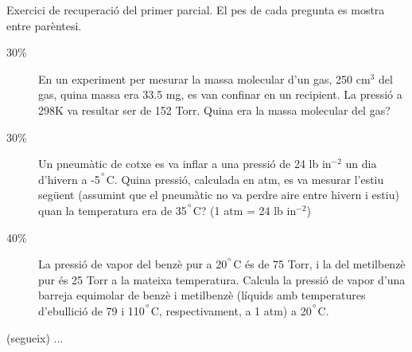 \documentclass[11pt]{article}
\begin{document}
\studentinfo
{}
\finishfirstpage

{
Exercici de recuperació del primer parcial. El pes de cada pregunta es mostra entre parèntesi.
\begin{description}
\item[30\%] En un experiment per mesurar la massa molecular d'un gas, 250 cm$^3$ del gas, quina massa era 33.5 mg, es van confinar en un recipient. La pressió a 298K va resultar ser de 152 Torr. Quina era la massa molecular del gas?
\item[30\%] Un pneumàtic de cotxe es va inflar a una pressió de 24 lb in$^{-2}$ un dia d'hivern a -5$^{\degree}$C. Quina pressió, calculada en atm, es va mesurar l'estiu següent (assumint que el pneumàtic no  va perdre aire entre hivern i estiu) quan la temperatura era de 35$^{\degree}$C? (1 atm = 24 lb in$^{-2}$)
\item[40\%] La pressió de vapor del benzè pur a 20$^{\degree}$C és de 75 Torr, i la del metilbenzè pur és 25 Torr a la mateixa temperatura. Calcula la pressió de vapor d'una barreja equimolar de benzè i metilbenzè (líquids amb temperatures d'ebullició de 79 i 110$^{\degree}$C, respectivament, a 1 atm) a 20$^{\degree}$C.
\end{description}
}
{
\vfill
\newpage (segueix) \newpage
}
{
...
}
\end{document}
